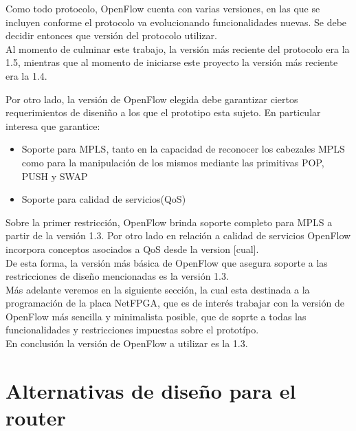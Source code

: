 
Como todo protocolo, OpenFlow cuenta con varias versiones, en las que se incluyen conforme el protocolo va evolucionando funcionalidades nuevas. Se debe decidir entonces que versi\'on del protocolo utilizar.\\

Al momento de culminar este trabajo, la versi\'on m\'as reciente del protocolo era la 1.5, mientras que al momento de iniciarse este proyecto la versi\'on m\'as reciente era la 1.4. 

Por otro lado, la versi\'on de OpenFlow elegida debe garantizar ciertos requerimientos de diseni\~no a los que el prototipo esta sujeto. En particular interesa que garantice:

\begin{itemize}
\item Soporte para MPLS, tanto en la capacidad de reconocer los cabezales MPLS como para la manipulaci\'on de los mismos mediante las primitivas POP, PUSH y SWAP
\item Soporte para calidad de servicios(QoS)
\end{itemize}

Sobre la primer restricci\'on, OpenFlow brinda soporte completo para MPLS a partir de la versi\'on 1.3. Por otro lado en relaci\'on a calidad de servicios OpenFlow incorpora conceptos asociados a QoS desde la version [cual].\\

De esta forma, la versi\'on m\'as b\'asica de OpenFlow que asegura soporte a las restricciones de dise\~no mencionadas es la versi\'on 1.3.\\

M\'as adelante veremos en la siguiente secci\'on, la cual  esta destinada a la programaci\'on de la placa NetFPGA, que es de inter\'es trabajar con la versi\'on de OpenFlow m\'as sencilla y minimalista posible, que de soprte a todas las funcionalidades y restricciones impuestas sobre el protot\'ipo.\\ 

En conclusi\'on la versi\'on de OpenFlow a utilizar es la 1.3.

\section[Alternativas de dise\~no para el router]{Alternativas de dise\~no para el router}

